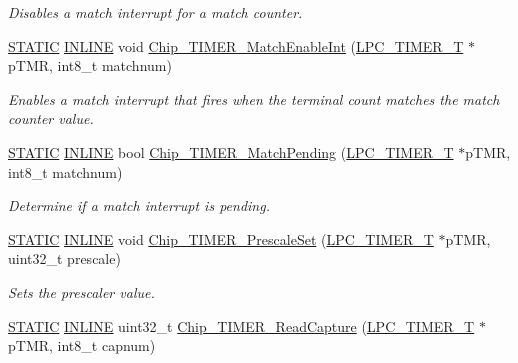 \begin{DoxyCompactItemize}
\begin{DoxyCompactList}\small\item\em Disables a match interrupt for a match counter. \end{DoxyCompactList}\item 
\hyperlink{group__LPC__Types__Public__Macros_ga10b2d890d871e1489bb02b7e70d9bdfb}{S\+T\+A\+T\+IC} \hyperlink{group__LPC__Types__Public__Types_ga2eb6f9e0395b47b8d5e3eeae4fe0c116}{I\+N\+L\+I\+NE} void \hyperlink{group__TIMER__17XX__40XX_ga21daeb9b42a0f7fe57ec52f3815ab223}{Chip\+\_\+\+T\+I\+M\+E\+R\+\_\+\+Match\+Enable\+Int} (\hyperlink{structLPC__TIMER__T}{L\+P\+C\+\_\+\+T\+I\+M\+E\+R\+\_\+T} $\ast$p\+T\+MR, int8\+\_\+t matchnum)
\begin{DoxyCompactList}\small\item\em Enables a match interrupt that fires when the terminal count matches the match counter value. \end{DoxyCompactList}\item 
\hyperlink{group__LPC__Types__Public__Macros_ga10b2d890d871e1489bb02b7e70d9bdfb}{S\+T\+A\+T\+IC} \hyperlink{group__LPC__Types__Public__Types_ga2eb6f9e0395b47b8d5e3eeae4fe0c116}{I\+N\+L\+I\+NE} bool \hyperlink{group__TIMER__17XX__40XX_ga0d61fd61d18ba82d44f1b5fec2e48a76}{Chip\+\_\+\+T\+I\+M\+E\+R\+\_\+\+Match\+Pending} (\hyperlink{structLPC__TIMER__T}{L\+P\+C\+\_\+\+T\+I\+M\+E\+R\+\_\+T} $\ast$p\+T\+MR, int8\+\_\+t matchnum)
\begin{DoxyCompactList}\small\item\em Determine if a match interrupt is pending. \end{DoxyCompactList}\item 
\hyperlink{group__LPC__Types__Public__Macros_ga10b2d890d871e1489bb02b7e70d9bdfb}{S\+T\+A\+T\+IC} \hyperlink{group__LPC__Types__Public__Types_ga2eb6f9e0395b47b8d5e3eeae4fe0c116}{I\+N\+L\+I\+NE} void \hyperlink{group__TIMER__17XX__40XX_gaa2483e6483702140e11de3183d5271f9}{Chip\+\_\+\+T\+I\+M\+E\+R\+\_\+\+Prescale\+Set} (\hyperlink{structLPC__TIMER__T}{L\+P\+C\+\_\+\+T\+I\+M\+E\+R\+\_\+T} $\ast$p\+T\+MR, uint32\+\_\+t prescale)
\begin{DoxyCompactList}\small\item\em Sets the prescaler value. \end{DoxyCompactList}\item 
\hyperlink{group__LPC__Types__Public__Macros_ga10b2d890d871e1489bb02b7e70d9bdfb}{S\+T\+A\+T\+IC} \hyperlink{group__LPC__Types__Public__Types_ga2eb6f9e0395b47b8d5e3eeae4fe0c116}{I\+N\+L\+I\+NE} uint32\+\_\+t \hyperlink{group__TIMER__17XX__40XX_ga7eab047dd60eef7fb0f042266f9dae05}{Chip\+\_\+\+T\+I\+M\+E\+R\+\_\+\+Read\+Capture} (\hyperlink{structLPC__TIMER__T}{L\+P\+C\+\_\+\+T\+I\+M\+E\+R\+\_\+T} $\ast$p\+T\+MR, int8\+\_\+t capnum)

\end{DoxyCompactItemize}
